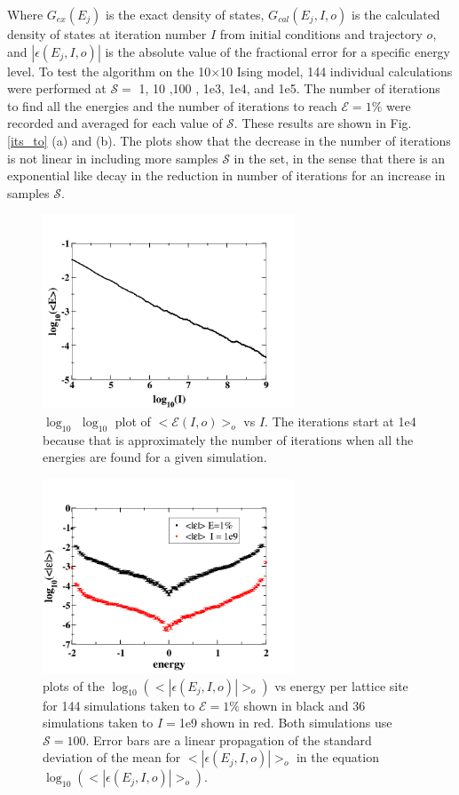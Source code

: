 \documentclass[aps,prl,reprint,superscriptaddress,showkeys]{revtex4-1}
\begin{document}
Where $G_{ex}(E_j)$ is the exact density of states, $G_{cal}(E_j,I,o)$ is the calculated density of states  at iteration number $I$ from initial conditions and trajectory $o$, and $|\epsilon(E_j,I,o)|$ is the absolute value of the fractional error for a specific energy level. To test the algorithm on the 10$\times$10 Ising model, 144 individual calculations were performed at  $\mathcal{S}=$ 1, 10 ,100 , 1e3,  1e4, and 1e5. The number of iterations to find all the energies and the number of iterations to  reach $\mathcal{E}=1\%$ were recorded and averaged for each value of $\mathcal{S}$. These results are shown in Fig. \ref{its_to}  (a) and (b).  The plots show that the decrease in the number of iterations is not linear in including more samples $\mathcal{S}$ in the set, in the sense that there is an exponential like decay in the reduction in number of  iterations for an increase in samples $\mathcal{S}$.  
\begin{figure}
\includegraphics[width=7.5cm]{Fig2.png}
\caption{\label{log_t_err}$\log_{10}$ $\log_{10}$ plot of $<\mathcal{E}(I,o)>_o$ vs $I$.  The iterations start at 1e4 because that is approximately the number of iterations when all the energies are found for a given simulation. }
\end{figure}
\begin{figure}
\includegraphics[width=7.5cm]{Fig3.png}
\caption{\label{rel_errors}plots of the $\log_{10}(<|\epsilon(E_j,I,o)|>_o )$ vs  energy per lattice site for 144 simulations taken to $\mathcal{E}=1\%$ shown in black and  36 simulations taken to $I=$1e9 shown in red. Both simulations use $\mathcal{S}=100$. Error bars are a linear propagation of the standard deviation of the mean for $<|\epsilon(E_j,I,o)|>_o$ in the equation $\log_{10}(<|\epsilon(E_j,I,o)|>_o )$. }
\end{figure}
\end{document}
